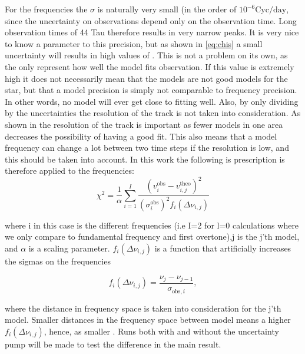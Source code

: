For the frequencies the $\sigma$ is naturally very small (in the order of $10^{-6} \text{Cyc}/\text{day}$, since the uncertainty on observations depend only on the observation time. Long observation times of 44 Tau therefore results in very narrow peaks. It is very nice to know a parameter to this precision, but as shown in \eqref{eq:chis} a small uncertainty will results in high values of \chis. This is not a problem on its own, as the \chis only represent how well the model fits observation. If this value is extremely high it does not necessarily mean that the models are not good models for the star, but that a model precision is simply not comparable to frequency precision. In other words, no model will ever get close to fitting well. Also, by only dividing by the uncertainties the resolution of the track is not taken into consideration. As shown in  the resolution of the track is important as fewer models in one area decreases the possibility of having a good fit. This also means that a model frequency can change a lot between two time steps if the resolution is low, and this should be taken into account. In this work the following is prescription is therefore applied to the frequencies: 
\begin{equation}
\label{sigma}
    \chi^2  = \frac{1}{\alpha}\sum^I_{i=1}\frac{\left(v^{\text{obs}}_{i}-v^{\text{theo}}_{i,j}\right)^2}{(\sigma^{\text{obs}}_i)^2 f_i(\Delta\nu_{i,j})}
\end{equation}

\noindent where i in this case is the different frequencies (i.e I=2 for l=0 calculations where we only compare to fundamental frequency and first overtone),j is the j'th model, and $\alpha$ is a scaling parameter. $f_i(\Delta \nu_{i,j})$ is a function that artificially increases the sigmas on the frequencies

\begin{equation}
\label{function}
    f_i(\Delta \nu_{i,j}) = \frac{\nu_j - \nu_{j-1}}{\sigma_{\text{obs},i}},
\end{equation}
 
\noindent where the distance in frequency space is taken into consideration for the j'th model. Smaller distances in the frequency space between model means a higher $f_i(\Delta \nu_{i,j})$, hence, as smaller \chis. Runs both with and without the uncertainty pump will be made to test the difference in the main result. 


